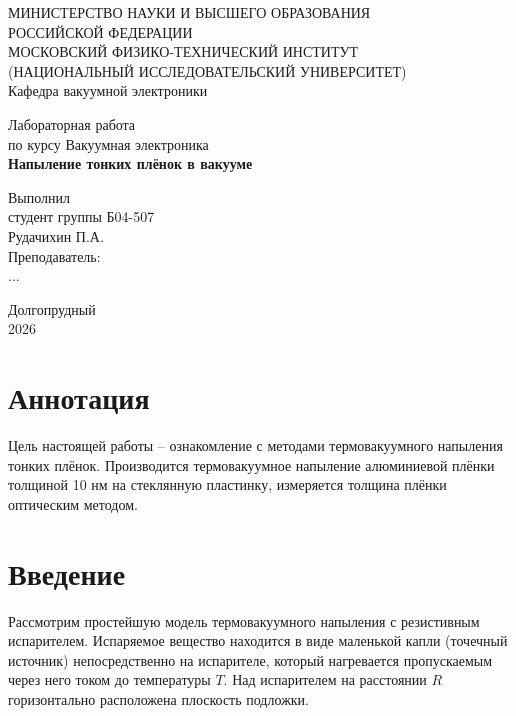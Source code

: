 \documentclass[a4paper, 14pt]{extarticle}
\begin{document}
	
	\begin{titlepage}
		\centering
		{\small МИНИСТЕРСТВО НАУКИ И ВЫСШЕГО ОБРАЗОВАНИЯ \\ РОССИЙСКОЙ ФЕДЕРАЦИИ\\
		МОСКОВСКИЙ ФИЗИКО-ТЕХНИЧЕСКИЙ ИНСТИТУТ\\
		(НАЦИОНАЛЬНЫЙ ИССЛЕДОВАТЕЛЬСКИЙ УНИВЕРСИТЕТ)\\
		\vspace {1cm}
		Кафедра вакуумной электроники\\}
		
		\vspace{4cm}
		
		Лабораторная работа \\
		по курсу Вакуумная электроника\\
		{\Large \textbf{Напыление тонких плёнок в вакууме}\\}
		
		\vspace{3cm}
		
		\begin{flushright}
			Выполнил \\
			студент группы Б04-507 \\
			Рудачихин П.А. \\
			\vspace{0.5cm}
			Преподаватель: \\
			...
		\end{flushright}
		
		\vfill
		
		Долгопрудный \\
		2026
	\end{titlepage}
	
	\section{Аннотация}
	
	\hspace{5mm} Цель настоящей работы -- ознакомление с методами термовакуумного напыления тонких плёнок. Производится термовакуумное напыление алюминиевой плёнки толщиной 10 нм на стеклянную пластинку, измеряется толщина плёнки оптическим методом.
	
	\section{Введение}
	
	\hspace{5mm} Рассмотрим простейшую модель термовакуумного напыления с резистивным испарителем. Испаряемое вещество находится в виде маленькой капли (точечный источник) непосредственно на испарителе, который нагревается пропускаемым через него током до температуры $T$. Над испарителем на расстоянии $R$ горизонтально расположена плоскость подложки.
	
\end{document}
